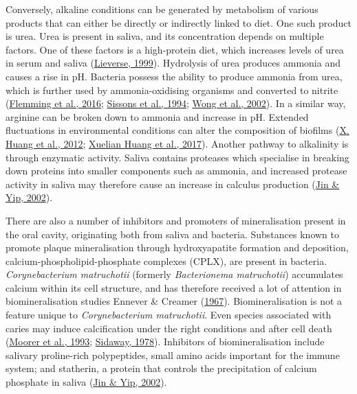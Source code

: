 \documentclass[
  letterpaper,
]{book}
\begin{document}
Conversely, alkaline conditions can be generated by metabolism of
various products that can either be directly or indirectly linked to
diet. One such product is urea. Urea is present in saliva, and its
concentration depends on multiple factors. One of these factors is a
high-protein diet, which increases levels of urea in serum and saliva
(\protect\hyperlink{ref-lieverseDietAetiology1999}{Lieverse, 1999}).
Hydrolysis of urea produces ammonia and causes a rise in pH. Bacteria
possess the ability to produce ammonia from urea, which is further used
by ammonia-oxidising organisms and converted to nitrite
(\protect\hyperlink{ref-flemmingBiofilmsEmergent2016}{Flemming et al.,
2016}; \protect\hyperlink{ref-sissonsPHResponse1994}{Sissons et al.,
1994}; \protect\hyperlink{ref-wongCalciumPhosphate2002}{Wong et al.,
2002}). In a similar way, arginine can be broken down to ammonia and
increase in pH. Extended fluctuations in environmental conditions can
alter the composition of biofilms
(\protect\hyperlink{ref-huangFactorsAssociated2012}{X. Huang et al.,
2012}; \protect\hyperlink{ref-huangEffectArginine2017}{Xuelian Huang et
al., 2017}). Another pathway to alkalinity is through enzymatic
activity. Saliva contains proteases which specialise in breaking down
proteins into smaller components such as ammonia, and increased protease
activity in saliva may therefore cause an increase in calculus
production (\protect\hyperlink{ref-jinSupragingivalCalculus2002}{Jin \&
Yip, 2002}).

There are also a number of inhibitors and promoters of mineralisation
present in the oral cavity, originating both from saliva and bacteria.
Substances known to promote plaque mineralisation through hydroxyapatite
formation and deposition, calcium-phospholipid-phosphate complexes
(CPLX), are present in bacteria. \emph{Corynebacterium matruchotii}
(formerly \emph{Bacterionema matruchotii}) accumulates calcium within
its cell structure, and has therefore received a lot of attention in
biomineralisation studies Ennever \& Creamer
(\protect\hyperlink{ref-enneverMicrobiologicCalcification1967}{1967}).
Biomineralisation is not a feature unique to \emph{Corynebacterium
matruchotii}. Even species associated with caries may induce
calcification under the right conditions and after cell death
(\protect\hyperlink{ref-moorerCalcificationCariogenic1993}{Moorer et
al., 1993};
\protect\hyperlink{ref-sidawayMicrobiologicalStudy1978a}{Sidaway,
1978}). Inhibitors of biomineralisation include salivary proline-rich
polypeptides, small amino acids important for the immune system; and
statherin, a protein that controls the precipitation of calcium
phosphate in saliva
(\protect\hyperlink{ref-jinSupragingivalCalculus2002}{Jin \& Yip,
2002}).
\end{document}
